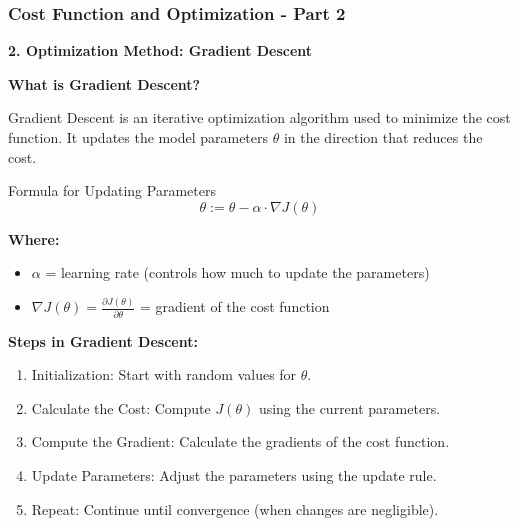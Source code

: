 \documentclass[aspectratio=169]{beamer}
\begin{document}
\begin{frame}[fragile]
    \frametitle{Cost Function and Optimization - Part 2}

    \textbf{2. Optimization Method: Gradient Descent}

    \textbf{What is Gradient Descent?}
    
    Gradient Descent is an iterative optimization algorithm used to minimize the cost function. It updates the model parameters $\theta$ in the direction that reduces the cost.

    \begin{block}{Formula for Updating Parameters}
        \begin{equation}
        \theta := \theta - \alpha \cdot \nabla J(\theta)
        \end{equation}
    \end{block}
    
    \textbf{Where:}
    \begin{itemize}
        \item $\alpha$ = learning rate (controls how much to update the parameters)
        \item $\nabla J(\theta) = \frac{\partial J(\theta)}{\partial \theta}$ = gradient of the cost function
    \end{itemize}

    \textbf{Steps in Gradient Descent:}
    \begin{enumerate}
        \item Initialization: Start with random values for $\theta$.
        \item Calculate the Cost: Compute $J(\theta)$ using the current parameters.
        \item Compute the Gradient: Calculate the gradients of the cost function.
        \item Update Parameters: Adjust the parameters using the update rule.
        \item Repeat: Continue until convergence (when changes are negligible).
    \end{enumerate}
\end{frame}
\end{document}

